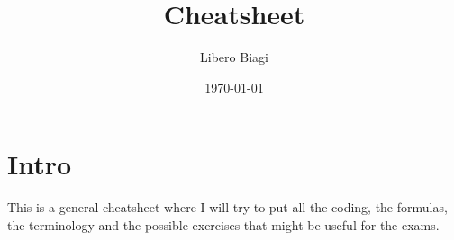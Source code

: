 \documentclass[a4paper,10pt]{article}
\begin{document}
\title{Cheatsheet}
\author{Libero Biagi}
\date{\today}
\maketitle

\section*{Intro}
This is a general cheatsheet where I will try to put all the coding, the formulas, the terminology and the possible exercises that might be useful for the exams.

\tableofcontents





\end{document}
